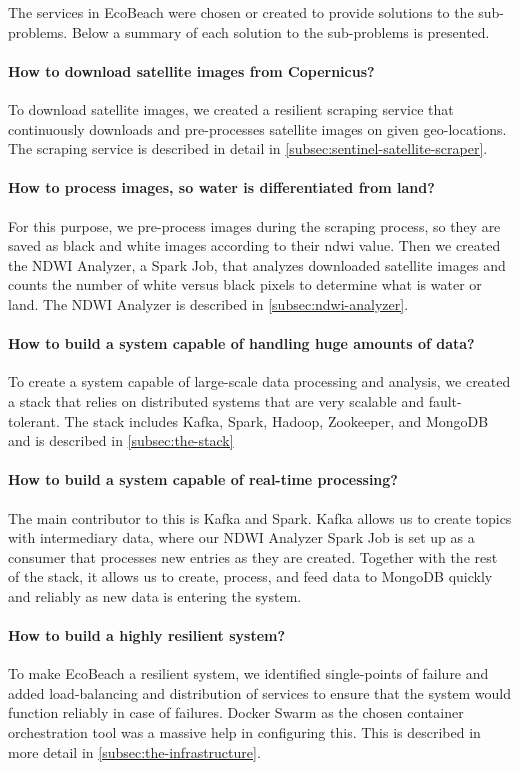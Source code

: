 \noindent
The services in EcoBeach were chosen or created to provide solutions to the sub-problems. Below a summary of each solution to the sub-problems is presented.

\paragraph{How to download satellite images from Copernicus?} To download satellite images, we created a resilient scraping service that continuously downloads and pre-processes satellite images on given geo-locations. The scraping service is described in detail in \autoref{subsec:sentinel-satellite-scraper}.

\paragraph{How to process images, so water is differentiated from land?} For this purpose, we pre-process images during the scraping process, so they are saved as black and white images according to their \acrfull{ndwi} value. Then we created the NDWI Analyzer, a Spark Job, that analyzes downloaded satellite images and counts the number of white versus black pixels to determine what is water or land. The NDWI Analyzer is described in \autoref{subsec:ndwi-analyzer}.

\paragraph{How to build a system capable of handling huge amounts of data?} To create a system capable of large-scale data processing and analysis, we created a stack that relies on distributed systems that are very scalable and fault-tolerant. The stack includes Kafka, Spark, Hadoop, Zookeeper, and MongoDB and is described in \autoref{subsec:the-stack}

\paragraph{How to build a system capable of real-time processing?} The main contributor to this is Kafka and Spark. Kafka allows us to create topics with intermediary data, where our NDWI Analyzer Spark Job is set up as a consumer that processes new entries as they are created. Together with the rest of the stack, it allows us to create, process, and feed data to MongoDB quickly and reliably as new data is entering the system.

\paragraph{How to build a highly resilient system?} To make EcoBeach a resilient system, we identified single-points of failure and added load-balancing and distribution of services to ensure that the system would function reliably in case of failures. Docker Swarm as the chosen container orchestration tool was a massive help in configuring this. This is described in more detail in \autoref{subsec:the-infrastructure}.

